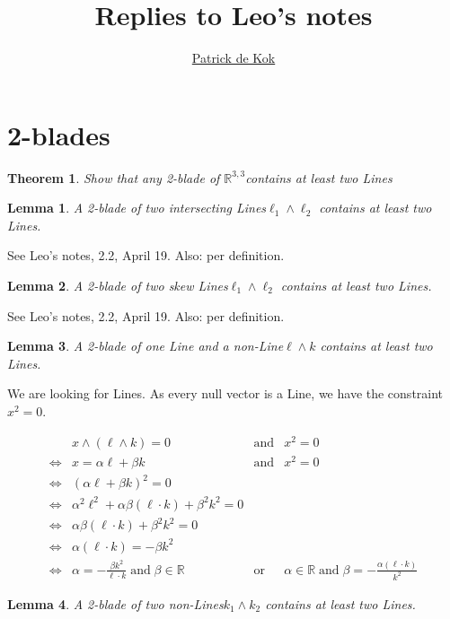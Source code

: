 \documentclass[a4paper,11pt,twoside,openright]{article}
\title{Replies to Leo's notes}
\author{\href{mailto:pkok@science.uva.nl}{Patrick de Kok}}
\newcommand{\textgt}[1]{\textsf{#1}}
\newcommand{\pLine}{\textgt{Line}\xspace}
\newcommand{\pLines}{\textgt{Line}s\xspace}
\newcommand{\Rl}{\ensuremath{\mathbb{R}^{3,3}}}
\newcommand{\en}{\ensuremath{\mathbin{\mbox{and}}}}
\newcommand{\of}{\ensuremath{\mathbin{\mbox{or}}}}
\newcommand{\eql}{\ensuremath{\Leftrightarrow}}
\newtheorem{theorem}{Theorem}
\newtheorem{lemma}{Lemma}
\begin{document}
\maketitle

\section{2-blades}
\begin{theorem}
Show that \emph{any} 2-blade of \Rl contains at least two \pLines
\end{theorem}

\begin{lemma}
A 2-blade of two intersecting \pLines $\ell_1 \wedge \ell_2$ contains at least two \pLines.
\end{lemma}
See Leo's notes, 2.2, April 19.  Also: per definition.

\begin{lemma}
A 2-blade of two skew \pLines $\ell_1 \wedge \ell_2$ contains at least two \pLines.
\end{lemma}
See Leo's notes, 2.2, April 19.  Also: per definition.

\begin{lemma}
A 2-blade of one \pLine and a non-\pLine $\ell \wedge k$ contains at least two \pLines.
\end{lemma}

We are looking for \pLines.  As every null vector is a \pLine, we have the constraint $x^2 = 0$.

\[
\begin{array}{rlcl}
 & x \wedge (\ell \wedge k) = 0 &\en& x^2 = 0 \\
\eql& x = \alpha \ell + \beta k &\en& x^2 = 0 \\
\eql& (\alpha \ell + \beta k)^2 = 0 \\
\eql& \alpha^2 \ell^2 + \alpha \beta \left(\ell \cdot k\right) + \beta^2 k^2 = 0 \\
\eql& \alpha \beta \left(\ell \cdot k\right) + \beta^2 k^2 = 0 \\
\eql& \alpha \left(\ell \cdot k\right) = -\beta k^2 \\
\eql& \alpha = -\frac{\beta k^2}{\ell \cdot k} \en \beta \in \mathbb{R} &\of& \alpha \in \mathbb{R} \en \beta = -\frac{\alpha\left(\ell \cdot k\right)}{k^2}
\end{array}
\]

\begin{lemma}
A 2-blade of two non-\pLines $k_1 \wedge k_2$ contains at least two \pLines.
\end{lemma}
\end{document}
